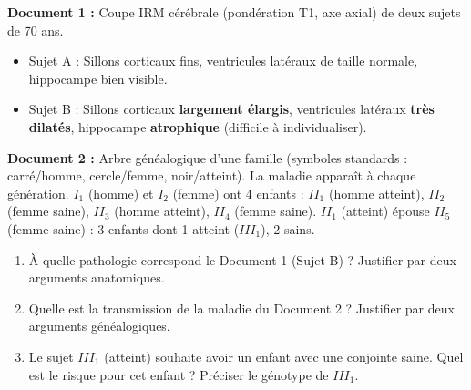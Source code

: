 \documentclass[11pt]{article}
\begin{document}
\begin{exercice}
\textbf{Document 1 :} Coupe IRM cérébrale (pondération T1, axe axial) de deux sujets de 70 ans.
\begin{itemize}
\item Sujet A : Sillons corticaux fins, ventricules latéraux de taille normale, hippocampe bien visible.
\item Sujet B : Sillons corticaux \textbf{largement élargis}, ventricules latéraux \textbf{très dilatés}, hippocampe \textbf{atrophique} (difficile à individualiser).
\end{itemize}
\textbf{Document 2 :} Arbre généalogique d'une famille (symboles standards : carré/homme, cercle/femme, noir/atteint). La maladie apparaît à chaque génération. $I_1$ (homme) et $I_2$ (femme) ont 4 enfants : $II_1$ (homme atteint), $II_2$ (femme saine), $II_3$ (homme atteint), $II_4$ (femme saine). $II_1$ (atteint) épouse $II_5$ (femme saine) : 3 enfants dont 1 atteint ($III_1$), 2 sains.

\begin{enumerate}
\item À quelle pathologie correspond le Document 1 (Sujet B) ? Justifier par deux arguments anatomiques.
\item Quelle est la transmission de la maladie du Document 2 ? Justifier par deux arguments généalogiques.
\item Le sujet $III_1$ (atteint) souhaite avoir un enfant avec une conjointe saine. Quel est le risque pour cet enfant ? Préciser le génotype de $III_1$.
\end{enumerate}
\end{exercice}
\end{document}
